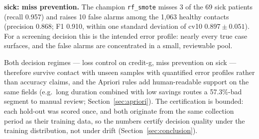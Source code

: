 \textbf{sick: miss prevention.} The champion \texttt{rf\_smote} misses 3 of the 69 sick patients (recall 0.957) and raises 10 false alarms among the 1{,}063 healthy contacts (precision 0.868; F1 0.910, within one standard deviation of cv10 $0.897\pm0.051$). For a screening decision this is the intended error profile: nearly every true case surfaces, and the false alarms are concentrated in a small, reviewable pool.

Both decision regimes --- loss control on credit-g, miss prevention on sick --- therefore survive contact with unseen samples with quantified error profiles rather than accuracy claims, and the Apriori rules add human-readable support on the same fields (e.g.\ long duration combined with low savings routes a 57.3\%-bad segment to manual review; Section~\ref{sec:apriori}). The certification is bounded: each hold-out was scored once, and both originate from the same collection period as their training data, so the numbers certify decision quality under the training distribution, not under drift (Section~\ref{sec:conclusion}).
